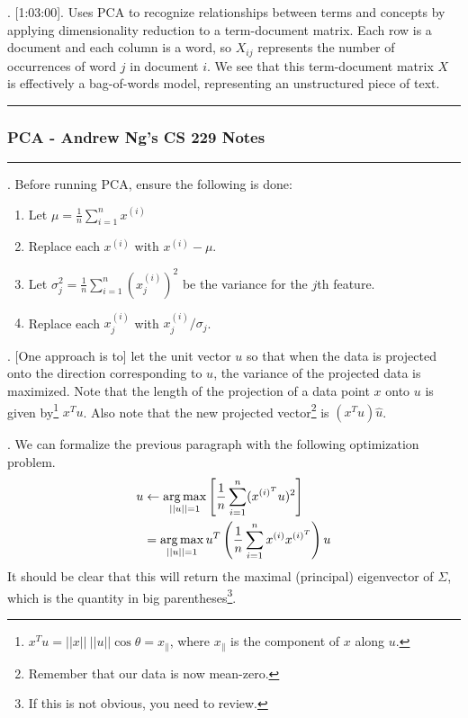 \documentclass[12pt]{article}
\newcommand{\myspace}{\vspace{2\bigskipamount}}
\newcommand\p{\Needspace{10\baselineskip} \noindent}
\begin{document}
\myspace
\p {}. [1:03:00]. Uses PCA  to  recognize  relationships  between  terms  and  concepts  by  applying dimensionality reduction to a term-document matrix. Each row is a document and each column is a word, so $X_{ij}$ represents the number of occurrences of word $j$ in document $i$. We see that this term-document matrix $X$ is effectively a bag-of-words model, representing an unstructured piece of text.


\newpage
\hrule
\subsubsection{PCA - Andrew Ng's CS 229 Notes}
\hrule

\myspace
\p {}. Before running PCA, ensure the following is done:
\begin{enumerate}
	\item Let $\mu = \tfrac{1}{n} \sum_{i = 1}^{n} x^{(i)}$
	\item Replace each $x^{(i)}$ with $x^{(i)} - \mu$. 
	\item Let $\sigma_j^2 = \tfrac{1}{n} \sum_{i = 1}^{n} \left(x_j^{(i)} \right)^2$ be the variance for the $j$th feature.
	\item Replace each $x_j^{(i)}$ with $x_j^{(i)}/\sigma_j$. 
\end{enumerate}

\myspace
\p {}. [One approach is to] let the unit vector $u$ so that when the data is projected onto the direction corresponding to $u$, the variance of the projected data is maximized. Note that the length of the projection of a data point $x$ onto $u$ is given by\footnote{$x^T u = ||x||~||u||\cos\theta = x_\parallel$, where $x_\parallel$ is the component of $x$ along $u$.} $x^T u$. Also note that the new projected vector\footnote{Remember that our data is now mean-zero.} is $(x^T u)\hat u$. 

\myspace 
\p {}. We can formalize the previous paragraph with the following optimization problem.
\begin{align}
	u &\leftarrow \operatorname*{arg\,max}_{||u||=1} \left[ \frac{1}{n} \sum_{i = 1}^n (x^{(i)^T} u)^2 \right] \\
	&=  \operatorname*{arg\,max}_{||u||=1}  u^T \left(\frac{1}{n} \sum_{i = 1}^n x^{(i)} x^{(i)^T} \right) u
\end{align}
It should be clear that this will return the maximal (principal) eigenvector of $\Sigma$, which is the quantity in big parentheses\footnote{If this is not obvious, you need to review.}.
\end{document}
